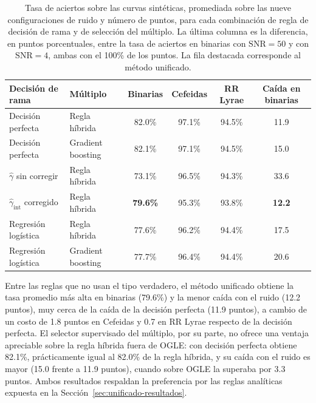 \documentclass[12pt,letterpaper,oneside]{book}
\begin{document}
\begin{table}[H]
	\centering
	\small
	\begin{tabular}{llcccc}
		\hline
		\textbf{Decisi\'on de rama} & \textbf{M\'ultiplo} & \textbf{Binarias} & \textbf{Cefeidas} & \textbf{RR Lyrae} & \textbf{Ca\'ida en binarias} \\
		\hline
		Decisi\'on perfecta & Regla h\'ibrida & 82.0\% & 97.1\% & 94.5\% & 11.9 \\
		Decisi\'on perfecta & Gradient boosting & 82.1\% & 97.1\% & 94.5\% & 15.0 \\
		$\hat\gamma$ sin corregir & Regla h\'ibrida & 73.1\% & 96.5\% & 94.3\% & 33.6 \\
		$\hat\gamma_{\mathrm{int}}$ corregido & Regla h\'ibrida & \textbf{79.6\%} & 95.3\% & 93.8\% & \textbf{12.2} \\
		Regresi\'on log\'istica & Regla h\'ibrida & 77.6\% & 96.2\% & 94.4\% & 17.5 \\
		Regresi\'on log\'istica & Gradient boosting & 77.7\% & 96.4\% & 94.4\% & 20.6 \\
		\hline
	\end{tabular}
	\caption[Aciertos sobre curvas sint\'eticas por combinaci\'on de reglas]{Tasa de aciertos sobre las curvas sint\'eticas, promediada sobre las nueve configuraciones de ruido y n\'umero de puntos, para cada combinaci\'on de regla de decisi\'on de rama y de selecci\'on del m\'ultiplo. La \'ultima columna es la diferencia, en puntos porcentuales, entre la tasa de aciertos en binarias con $\mathrm{SNR}=50$ y con $\mathrm{SNR}=4$, ambas con el 100\% de los puntos. La fila destacada corresponde al m\'etodo unificado.}
	\label{tab:validacion-sinteticas}
\end{table}

Entre las reglas que no usan el tipo verdadero, el m\'etodo unificado obtiene la tasa promedio m\'as alta en binarias (79.6\%) y la menor ca\'ida con el ruido (12.2 puntos), muy cerca de la ca\'ida de la decisi\'on perfecta (11.9 puntos), a cambio de un costo de 1.8 puntos en Cefeidas y 0.7 en RR Lyrae respecto de la decisi\'on perfecta. El selector supervisado del m\'ultiplo, por su parte, no ofrece una ventaja apreciable sobre la regla h\'ibrida fuera de OGLE: con decisi\'on perfecta obtiene 82.1\%, pr\'acticamente igual al 82.0\% de la regla h\'ibrida, y su ca\'ida con el ruido es mayor (15.0 frente a 11.9 puntos), cuando sobre OGLE la superaba por 3.3 puntos. Ambos resultados respaldan la preferencia por las reglas anal\'iticas expuesta en la Secci\'on~\ref{sec:unificado-resultados}.
\end{document}
